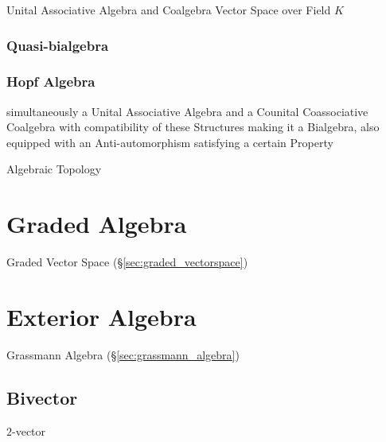 Unital Associative Algebra and Coalgebra Vector Space over Field $K$



\subsubsection{Quasi-bialgebra}\label{sec:quasi_bialgebra}

\subsubsection{Hopf Algebra}\label{sec:hopf_algebra}

simultaneously a Unital Associative Algebra and a Counital
Coassociative Coalgebra with compatibility of these Structures making
it a Bialgebra, also equipped with an Anti-automorphism satisfying a
certain Property %

Algebraic Topology



\section{Graded Algebra}\label{sec:graded_algebra}

Graded Vector Space (\S\ref{sec:graded_vectorspace})



\section{Exterior Algebra}\label{sec:exterior_algebra}


Grassmann Algebra (\S\ref{sec:grassmann_algebra})



\subsection{Bivector}\label{sec:bivector}

$2$-vector

